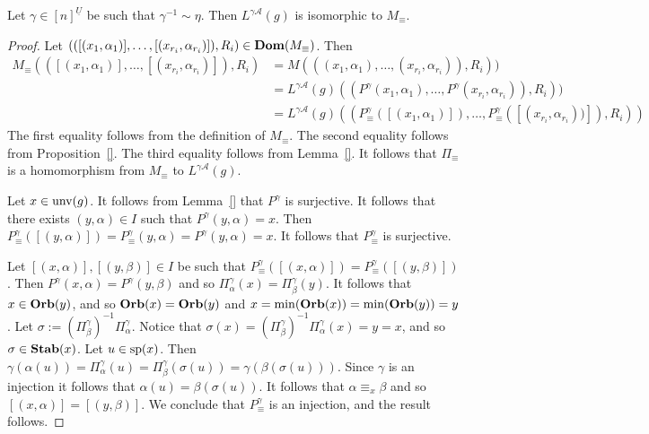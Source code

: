\documentclass[../main/thesis.tex]{subfiles}
\begin{document}
\begin{thm}
	Let $\gamma \in [n]^{\underline{U}}$ be such that $\gamma^{-1} \sim \eta$.
  Then $L^{\gamma\mathcal{A}}(g)$ is isomorphic to $M_{\equiv}$.
	\label{thm:M-to-L-isomorphism}
\end{thm}
\begin{proof}
  Let $(([(x_1, \alpha_1)], \ldots, [(x_{r_i}, \alpha_{r_i})]), R_i) \in \text{\textbf{Dom}}
  (M_\equiv)$. Then
  \begin{align*}
    M_\equiv (([(x_1, \alpha_1)], \ldots, [(x_{r_i},
    \alpha_{r_i})]), R_i) &= M(((x_1, \alpha_1), \ldots, (x_{r_i}, \alpha_{r_i})),
                            R_i))\\
                          &= L^{\gamma\mathcal{A}}(g)((P^{\gamma}(x_1, \alpha_1), \ldots,
                            P^{\gamma}(x_{r_i}, \alpha_{r_i})), R_i))\\ 
                          &= L^{\gamma\mathcal{A}}(g)((P^{\gamma}_{\equiv}([(x_1, \alpha_1)]), \ldots,
                            P^{\gamma}_{\equiv}([(x_{r_i}, \alpha_{r_i}))]), R_i))
  \end{align*}
  The first equality follows from the definition of $M_\equiv$. The second
  equality follows from Proposition~\ref{}. The third equality follows from
  Lemma~\ref{}. It follows that $\Pi_{\equiv}$ is a homomorphism from $M_\equiv$
  to $L^{\gamma\mathcal{A}}(g)$.

  Let $x \in \text{unv}(g)$. It follows from Lemma~\ref{} that $P^{\gamma}$ is
  surjective. It follows that there exists $(y, \alpha) \in I$ such that
  $P^{\gamma}(y, \alpha) = x$. Then $P^{\gamma}_{\equiv} ([(y, \alpha)])=
  P^{\gamma}_{\equiv} (y, \alpha) = P^{\gamma}(y, \alpha) = x$. It follows that
  $P^{\gamma}_{\equiv}$ is surjective.

  Let $[(x, \alpha)], [(y, \beta)] \in I$ be such that $P^{\gamma}_{\equiv}
  ([(x, \alpha)]) = P^{\gamma}_{\equiv} ([(y, \beta)])$. Then $P^{\gamma} (x,
  \alpha) = P^{\gamma} (y, \beta)$ and so $\Pi^{\gamma}_{\alpha}(x) =
  \Pi^{\gamma}_\beta(y)$. It follows that $x \in \text{\textbf{Orb}}(y)$, and so $\text{\textbf{Orb}} (x) =
  \text{\textbf{Orb}} (y)$ and $x = \min(\text{\textbf{Orb}}(x)) = \min(\text{\textbf{Orb}}(y)) = y$. Let $\sigma
  :=(\Pi^{\gamma}_\beta)^{-1} \Pi^{\gamma}_\alpha$. Notice that $\sigma (x) =
  (\Pi^{\gamma}_\beta)^{-1} \Pi^{\gamma}_\alpha (x) = y = x$, and so $\sigma \in
  \text{\textbf{Stab}}(x)$. Let $u \in \text{sp}(x)$. Then $\gamma (\alpha (u)) =
  \Pi^\gamma_{\alpha}(u) = \Pi^{\gamma}_{\beta}(\sigma (u)) = \gamma (\beta
  (\sigma (u)))$. Since $\gamma$ is an injection it follows that $\alpha (u) =
  \beta (\sigma (u))$. It follows that $\alpha \equiv_x \beta$ and so $[(x,
  \alpha)] = [(y, \beta)]$. We conclude that $P^{\gamma}_\equiv$ is an
  injection, and the result follows.
\end{proof}
\end{document}
